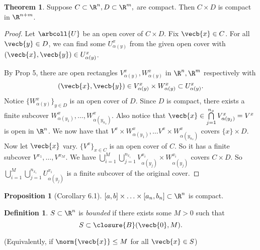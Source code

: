 \documentclass[a5paper]{article}
\theoremstyle{definition}%
\newtheorem{theorem}{Theorem}
\newtheorem*{proposition*}{Proposition}
\newtheorem*{definition*}{Definition}
\numberwithin{exercise}{section}
\theoremstyle{remark}%
\begin{document}
\begin{highlight}
\begin{theorem}
Suppose $C\subset \R^n,  D\subset \R^m,$ are compact. Then $C\times D$ is compact in $\R^{n+m}$.
\end{theorem}
\end{highlight}
\begin{proof}
Let $\arbcoll{U}$ be an open cover of $C\times D$. Fix $\vecb{x}\in C$. For all $\vecb{y}\in D$, we can find some $U_{\alpha(y)}^x$ from the given open cover with $(\vecb{x},\vecb{y})\in U_{\alpha(y)}^x$. 


By Prop 5, there are open rectangles $V_{\alpha(y)}^x, W_{\alpha(y)}^x$ in $\R^n, \R^m$ respectively with 
$$(\vecb{x},\vecb{y})\in V_{\alpha(y)}^x\times W_{\alpha(y)}^x \subset U_{\alpha(y)}^x.$$
Notice $\{W_{\alpha(y)}^x\}_{y\in D}$ is an open cover of $D$. Since $D$ is compact, there exists a finite subcover $W_{\alpha({y_1})}^x, 
\ldots, W_{\alpha({y_{n_x}})}^x$. Also notice that $\vecb{x}\in \bigcap\limits_{j=1}^{n_x}V_{\alpha(y_j)}^x = V^x$ is open in $\R^n$. We now have that $V^x\times W_{\alpha({y_1})}^x, \ldots V^x\times W_{\alpha({y_{n_x}})}^x$ covers $\{x\}\times D$. \\

Now let $\vecb{x}$ vary. $\{V^x\}_{x\in C}$ is an open cover of $C$. So it has a finite subcover $V^{x_1}, \ldots, V^{x_M}$. We have $\bigcup_{i=1}^M\bigcup_{j=1}^{n_{x_i}} V_{\alpha(y_j)}^{x_i} \times W_{\alpha(y_j)}^{x_i}$ covers $C\times D$. So $\bigcup_{i=1}^M\bigcup_{j=1}^{n_{x_i}} U_{\alpha(y_j)}^{x_i}$ is a finite subcover of the original cover. 
\end{proof}

\begin{proposition*}[Corollary 6.1]
$[a,b]\times \ldots \times [a_n,b_n] \subset \R^n$ is compact. 
\end{proposition*}

\begin{highlight}
\begin{definition*}
$S\subset \R^n$ is \emph{bounded} if there exists some $M>0$ such that 
$$S\subset\closure{B}(\vecb{0},M).$$

(Equivalently, if $\norm{\vecb{x}} \leq M$ for all $\vecb{x}\in S$)
\end{definition*}
\end{highlight}
\end{document}
